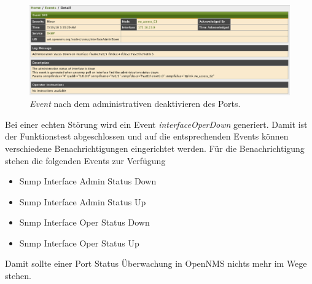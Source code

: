 \begin{figure}[H]
	\centering
	\includegraphics[width=1.0\textwidth]{images/use-cases/monitoring-layer-2/port-admin-down-event}
	\caption{\emph{Event} nach dem administrativen deaktivieren des Ports.}
	\label{pic:port-admin-down-event}
\end{figure}

Bei einer echten Störung wird ein Event \emph{interfaceOperDown} generiert. Damit ist der Funktionstest abgeschlossen und auf die entsprechenden Events können verschiedene Benachrichtigungen eingerichtet werden. Für die Benachrichtigung stehen die folgenden Events zur Verfügung

\begin{itemize}
  \item{Snmp Interface Admin Status Down}
  \item{Snmp Interface Admin Status Up}
  \item{Snmp Interface Oper Status Down}
  \item{Snmp Interface Oper Status Up}
\end{itemize}

Damit sollte einer Port Status Überwachung in OpenNMS nichts mehr im Wege stehen.